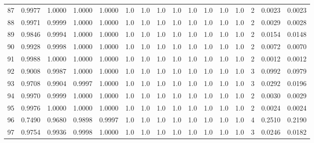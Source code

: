 \begin{tabular}{lrrrrrrrrrrrrrrr}
87  &      0.9977 &  1.0000 &  1.0000 &  1.0000 &     1.0 &     1.0 &     1.0 &     1.0 &     1.0 &     1.0 &      1.0 &        1.0 &      2 &                    0.0023 &                     0.0023 \\
88  &      0.9971 &  0.9999 &  1.0000 &  1.0000 &     1.0 &     1.0 &     1.0 &     1.0 &     1.0 &     1.0 &      1.0 &        1.0 &      2 &                    0.0029 &                     0.0028 \\
89  &      0.9846 &  0.9994 &  1.0000 &  1.0000 &     1.0 &     1.0 &     1.0 &     1.0 &     1.0 &     1.0 &      1.0 &        1.0 &      2 &                    0.0154 &                     0.0148 \\
90  &      0.9928 &  0.9998 &  1.0000 &  1.0000 &     1.0 &     1.0 &     1.0 &     1.0 &     1.0 &     1.0 &      1.0 &        1.0 &      2 &                    0.0072 &                     0.0070 \\
91  &      0.9988 &  1.0000 &  1.0000 &  1.0000 &     1.0 &     1.0 &     1.0 &     1.0 &     1.0 &     1.0 &      1.0 &        1.0 &      2 &                    0.0012 &                     0.0012 \\
92  &      0.9008 &  0.9987 &  1.0000 &  1.0000 &     1.0 &     1.0 &     1.0 &     1.0 &     1.0 &     1.0 &      1.0 &        1.0 &      3 &                    0.0992 &                     0.0979 \\
93  &      0.9708 &  0.9904 &  0.9997 &  1.0000 &     1.0 &     1.0 &     1.0 &     1.0 &     1.0 &     1.0 &      1.0 &        1.0 &      3 &                    0.0292 &                     0.0196 \\
94  &      0.9970 &  0.9999 &  1.0000 &  1.0000 &     1.0 &     1.0 &     1.0 &     1.0 &     1.0 &     1.0 &      1.0 &        1.0 &      2 &                    0.0030 &                     0.0029 \\
95  &      0.9976 &  1.0000 &  1.0000 &  1.0000 &     1.0 &     1.0 &     1.0 &     1.0 &     1.0 &     1.0 &      1.0 &        1.0 &      2 &                    0.0024 &                     0.0024 \\
96  &      0.7490 &  0.9680 &  0.9898 &  0.9997 &     1.0 &     1.0 &     1.0 &     1.0 &     1.0 &     1.0 &      1.0 &        1.0 &      4 &                    0.2510 &                     0.2190 \\
97  &      0.9754 &  0.9936 &  0.9998 &  1.0000 &     1.0 &     1.0 &     1.0 &     1.0 &     1.0 &     1.0 &      1.0 &        1.0 &      3 &                    0.0246 &                     0.0182 \\

\end{tabular}
